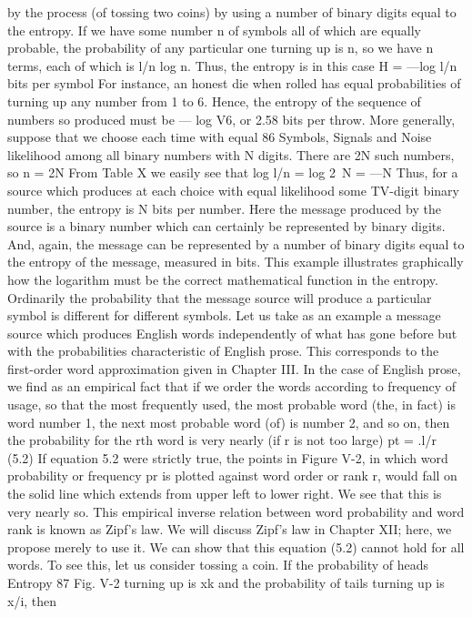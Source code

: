 by the process (of tossing two coins) by using a number of binary
digits equal to the entropy.
If we have some number n of symbols all of which are equally
probable, the probability of any particular one turning up is \/n,
so we have n terms, each of which is l/n log \/n. Thus, the entropy
is in this case
H = —log l/n bits per symbol
For instance, an honest die when rolled has equal probabilities of
turning up any number from 1 to 6. Hence, the entropy of the
sequence of numbers so produced must be — log V6, or 2.58 bits
per throw.
More generally, suppose that we choose each time with equal
86 Symbols, Signals and Noise
likelihood among all binary numbers with N digits. There are 2N
such numbers, so
n = 2N
From Table X we easily see that
log l/n = log 2~N = —N
Thus, for a source which produces at each choice with equal likelihood
some TV-digit binary number, the entropy is N bits per number.
Here the message produced by the source is a binary number
which can certainly be represented by binary digits. And, again,
the message can be represented by a number of binary digits equal
to the entropy of the message, measured in bits. This example
illustrates graphically how the logarithm must be the correct
mathematical function in the entropy.
Ordinarily the probability that the message source will produce
a particular symbol is different for different symbols. Let us take
as an example a message source which produces English words
independently of what has gone before but with the probabilities
characteristic of English prose. This corresponds to the first-order
word approximation given in Chapter III.
In the case of English prose, we find as an empirical fact that if
we order the words according to frequency of usage, so that the
most frequently used, the most probable word (the, in fact) is word
number 1, the next most probable word (of) is number 2, and so
on, then the probability for the rth word is very nearly (if r is not
too large)
pt = .l/r (5.2)
If equation 5.2 were strictly true, the points in Figure V-2, in which
word probability or frequency pr is plotted against word order or
rank r, would fall on the solid line which extends from upper left
to lower right. We see that this is very nearly so. This empirical
inverse relation between word probability and word rank is known
as Zipf’s law. We will discuss Zipf’s law in Chapter XII; here, we
propose merely to use it.
We can show that this equation (5.2) cannot hold for all words.
To see this, let us consider tossing a coin. If the probability of heads
Entropy 87
Fig. V-2
turning up is xk and the probability of tails turning up is x/i, then
